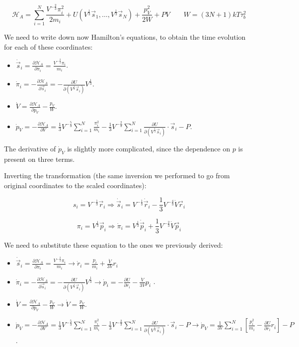 $$\mathcal{H}_A = \sum\limits_{i=1}^N\frac{V^{-\frac{2}{3}}\pi_i^2}{2m_i}+ U(V^\frac{1}{3}\vec{s}_1, \dots, V^{\frac{1}{3}}\vec{s}_N) + \frac{p_V^2}{2W} + PV\qquad W = (3N+1)kT\tau_b^2$$


We need to write down now Hamilton's equations, to obtain the time evolution for each of these coordinates:

\begin{itemize}
	\item $\dot{\vec{s}}_i = \frac{\partial \mathcal{H}_A}{\partial\pi_i} = \frac{V^{-\frac{2}{3}}\pi_i}{m_i}$.
	\item $\dot{\pi}_i = -\frac{\partial\mathcal{H}_A}{\partial\vec{s}_i} = -\frac{\partial U}{\partial (V^{\frac{1}{3}}\vec{s}_i)}V^{\frac{1}{3}}$.
	\item $\dot{V} = \frac{\partial\mathcal{H}_A}{\partial p_V}-\frac{p_V}{W}$.
	\item $\dot{p}_V = -\frac{\partial\mathcal{H}_A}{\partial V} = \frac{1}{3}V^{-\frac{5}{3}}\sum\limits_{i=1}^N\frac{\pi_i^2}{m_i}-\frac{1}{3}V^{-\frac{2}{3}}\sum\limits_{i=1}^N\frac{\partial U}{\partial(V^{\frac{1}{3}}\vec{s}_i)}\cdot\vec{s}_i-P$.
\end{itemize}

The derivative of $\dot{p}_V$ is slightly more complicated, since the dependence on $p$ is present on three terms.

Inverting the transformation (the same inversion we performed to go from original coordinates to the scaled coordinates):

$$s_i = V^{-\frac{1}{3}}\vec{r}_i\Rightarrow \dot{\vec{s}}_i = V^{-\frac{1}{3}}\dot{\vec{r}}_i-\frac{1}{3}V^{-\frac{4}{3}}\dot{V}\vec{r}_i$$


$$\pi_i = V^{\frac{1}{3}}\vec{p}_i \Rightarrow \dot{\pi}_i = V^{\frac{1}{3}}\dot{\vec{p}}_i + \frac{1}{3}V^{-\frac{2}{3}}\dot{V}\vec{p}_i$$


We need to substitute these equation to the ones we previously derived:

\begin{itemize}
	\item $\dot{\vec{s}}_i = \frac{\partial \mathcal{H}_A}{\partial\pi_i} = \frac{V^{-\frac{2}{3}}\pi_i}{m_i} \rightarrow \dot{r}_i = \frac{p_i}{m_i} + \frac{\dot{V}}{3V} r_i$
	\item $\dot{\pi}_i = -\frac{\partial\mathcal{H}_A}{\partial\vec{s}_i} = -\frac{\partial U}{\partial (V^{\frac{1}{3}}\vec{s}_i)}V^{\frac{1}{3}} \rightarrow \dot{p}_i = - \frac{\partial U}{\partial r_i} - \frac{\dot{V} }{3V} p_i$ .
	\item $\dot{V} = \frac{\partial\mathcal{H}_A}{\partial p_V}-\frac{p_V}{W} \rightarrow \dot{V} = \frac{p_V}{W}$.
	\item $\dot{p}_V = -\frac{\partial\mathcal{H}_A}{\partial V} = \frac{1}{3}V^{-\frac{5}{3}}\sum\limits_{i=1}^N\frac{\pi_i^2}{m_i}-\frac{1}{3}V^{-\frac{2}{3}}\sum\limits_{i=1}^N\frac{\partial U}{\partial(V^{\frac{1}{3}}\vec{s}_i)}\cdot\vec{s}_i-P \rightarrow \dot{p}_V = \frac{1}{3V} \sum^N_{i=1} [\frac{p^2_i}{m_i} - \frac{\partial U}{\partial r_i} r_i] -P$.
\end{itemize}

